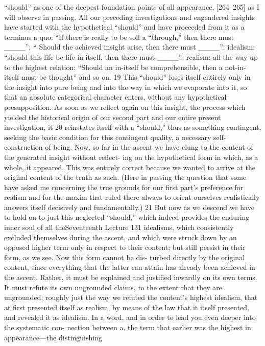 “should” as one of the deepest foundation points of all appearance, [264–265]
as I will observe in passing. All our preceding investigations and engendered
insights have started with the hypothetical “should” and have proceeded from
it as a terminus a quo: “If there is really to be {soll} a “through,” then there must
____”; “ Should the achieved insight arise, then there must ____”: idealism;
“should this life be life in itself, then there must ____”: realism; all the way up
to the highest relation: “Should an in-itself be comprehensible, then a not-in-
itself must be thought” and so on. 19
This “should” loses itself entirely only in the insight into pure being and
into the way in which we evaporate into it, so that an absolute categorical
character enters, without any hypothetical presupposition. As soon as we
reflect again on this insight, the process which yielded the historical origin of
our second part and our entire present investigation, it 20 reinstates itself with
a “should,” thus as something contingent, seeking the basic condition for this
contingent quality, a necessary self-construction of being. Now, so far in the
ascent we have clung to the content of the generated insight without reflect-
ing on the hypothetical form in which, as a whole, it appeared. This was
entirely correct because we wanted to arrive at the original content of the truth
as such. (Here in passing the question that some have asked me concerning
the true grounds for our first part’s preference for realism and for the maxim
that ruled there always to orient ourselves realistically answers itself decisively
and fundamentally.) 21 But now as we descend we have to hold on to just this
neglected “should,” which indeed provides the enduring inner soul of all theSeventeenth Lecture
131
idealisms, which consistently excluded themselves during the ascent, and
which were struck down by an opposed higher term only in respect to their
content; but still persist in their form, as we see. Now this form cannot be dis-
turbed directly by the original content, since everything that the latter can
attain has already been achieved in the ascent. Rather, it must be explained
and justified inwardly on its own terms. It must refute its own ungrounded
claims, to the extent that they are ungrounded; roughly just the way we refuted
the content’s highest idealism, that at first presented itself as realism, by means
of the law that it itself presented, and revealed it as idealism.
In a word, and in order to lead you even deeper into the systematic con-
nection between
a. the term that earlier was the highest in appearance—the distinguishing
